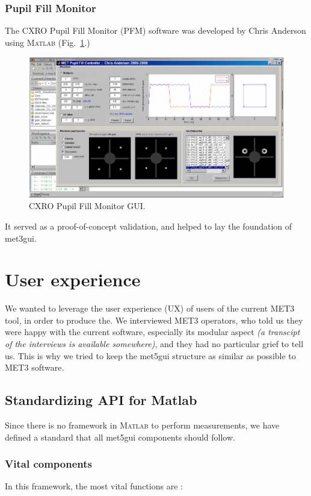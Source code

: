 \documentclass[10pt,letter,twoside]{report}
\newcommand{\comment}[1] {{\it (#1)}}
\begin{document}
			\subsubsection{Pupil Fill Monitor}
			The CXRO Pupil Fill Monitor (PFM) software was developed by Chris Anderson using \textsc{Matlab} (Fig.~\ref{fig:met3-pupil}.) 
			
			\begin{figure}[!ht]
			\centerline{\includegraphics[scale=0.5]{img/met3-pupil.png}}
			\caption{CXRO Pupil Fill Monitor GUI.}
			\label{fig:met3-pupil}
			\end{figure}
			It served as a proof-of-concept validation, and helped to lay the foundation of met3gui.

	\vfill
	\clearpage
	\section{User experience}
	We wanted to leverage the user experience (UX) of users of the current MET3 tool, in order to produce the. 
	We interviewed MET3 operators, who told us they were happy with the current software, especially its modular aspect \comment{a transcipt of the interviews is available somewhere}, and they had no particular grief to tell us. 
	This is why we tried to keep the met5gui structure as similar as possible to MET3 software.
	
	\subsection{Standardizing API for Matlab}
			Since there is no framework in \textsc{Matlab} to perform measurements, we have defined a standard that all met5gui components should follow.
		
	\subsubsection{Vital components}
	\label{sec:vital}
			In this framework, the most vital functions are :
			
\end{document}

